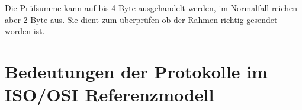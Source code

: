 \documentclass[12pt, a4paper, ngerman]{article}
\newcommand{\osi}{ISO/OSI Referenzmodell\xspace}
\begin{document}
Die Prüfsumme kann auf bis 4 Byte ausgehandelt werden, im Normalfall reichen aber 2 Byte aus. Sie dient zum überprüfen ob der Rahmen richtig gesendet worden ist.


\section{Bedeutungen der Protokolle im \osi }

\nocite{*} 

\newpage
\sloppy
\printbibliography 



\newpage
\listoffigures
\end{document}
